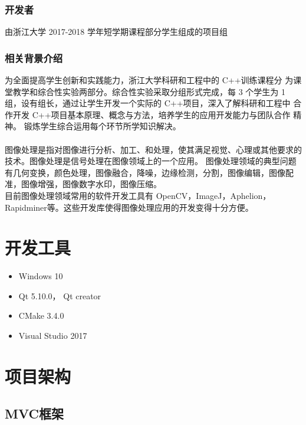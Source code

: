 \documentclass[14pt,a4paper]{article}
\begin{document}
\subsubsection{开发者 }
由浙江大学 2017-2018 学年短学期课程部分学生组成的项目组
\subsubsection{相关背景介绍}

为全面提高学生创新和实践能力，浙江大学科研和工程中的 C++训练课程分
为课堂教学和综合性实验两部分。综合性实验采取分组形式完成，每 3 个学生为
1 组，设有组长，通过让学生开发一个实际的 C++项目，深入了解科研和工程中
合作开发 C++项目基本原理、概念与方法，培养学生的应用开发能力与团队合作
精神。 锻炼学生综合运用每个环节所学知识解决。\\\\

图像处理是指对图像进行分析、加工、和处理，使其满足视觉、心理或其他要求的技术。图像处理是信号处理在图像领域上的一个应用。 图像处理领域的典型问题有几何变换，颜色处理，图像融合，降噪，边缘检测，分割，图像编辑，图像配准，图像增强，图像数字水印，图像压缩。\\

目前图像处理领域常用的软件开发工具有 OpenCV，ImageJ，Aphelion，
\\ Rapidminer等。这些开发库使得图像处理应用的开发变得十分方便。 


\newpage
\section{开发工具}
\begin{itemize}
	\item Windows 10 
	\item Qt 5.10.0， Qt creator
	\item CMake 3.4.0
	\item Visual Studio 2017
\end{itemize}



\newpage
\section{项目架构}
\subsection{MVC框架}
\end{document}
